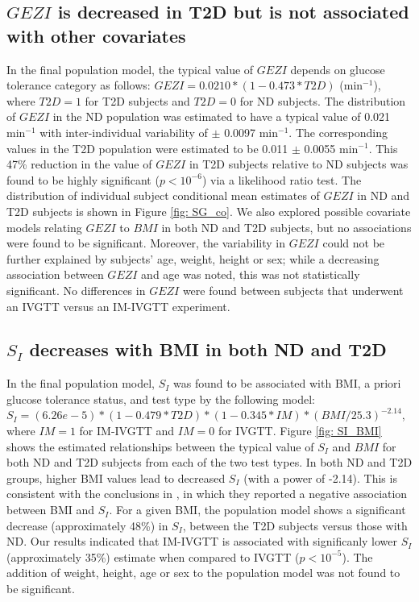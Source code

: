 \documentclass[utf8]{frontiersSCNS} %
\begin{document}
\subsection{$GEZI$ is decreased in T2D but is not associated with other covariates}
In the final population model, the typical value of $GEZI$ depends on glucose tolerance category as follows: $GEZI=0.0210*(1-0.473*T2D)$ (min$^{-1}$), where $T2D=1$ for T2D subjects and $T2D=0$ for ND subjects. The distribution of $GEZI$ in the ND population was estimated to have a typical value of 0.021 min$^{-1}$  with inter-individual variability of $\pm$ 0.0097 min$^{-1}$. The corresponding values in the T2D population were estimated to be 0.011 $\pm$ 0.0055 min$^{-1}$. This 47\% reduction in the value of $GEZI$ in T2D subjects relative to ND subjects was found to be highly significant ($p<10^{-6}$) via a likelihood ratio test. The distribution of individual subject conditional mean estimates of $GEZI$ in ND and T2D subjects is shown in Figure \ref{fig: SG_co}. We also explored possible covariate models relating $GEZI$ to $BMI$ in both ND and T2D subjects, but no associations were found to be significant. Moreover, the variability in $GEZI$ could not be further explained by subjects’ age, weight, height or sex; while a decreasing association between $GEZI$ and age was noted, this was not statistically significant. No differences in $GEZI$ were found between subjects that underwent an IVGTT versus an IM-IVGTT experiment.

\vskip 0.5cm
\subsection{$S_I$ decreases with BMI in both ND and T2D}
In the final population model, $S_I$ was found to be associated with BMI, a priori glucose tolerance status, and test type by the following model: $S_I=(6.26e-5)*(1-0.479*T2D)*(1-0.345*IM)*(BMI/25.3)^{-2.14}$, where $IM=1$ for IM-IVGTT and $IM=0$ for IVGTT. Figure \ref{fig: SI_BMI} shows the estimated relationships between the typical value of $S_I$ and $BMI$ for both ND and T2D subjects from each of the two test types. In both ND and T2D groups, higher BMI values lead to decreased $S_I$ (with a power of -2.14). This is consistent with the conclusions in \citet{Bergman1997TheTolerance}, in which they reported a negative association between BMI and $S_I$. For a given BMI, the population model shows a significant decrease (approximately 48\%) in $S_I$, between the T2D subjects versus those with ND. Our results indicated that IM-IVGTT is associated with significanly lower $S_I$ (approximately 35\%) estimate when compared to IVGTT ($p<10^{-5}$). The addition of weight, height, age or sex to the population model was not found to be significant.\\
\end{document}
